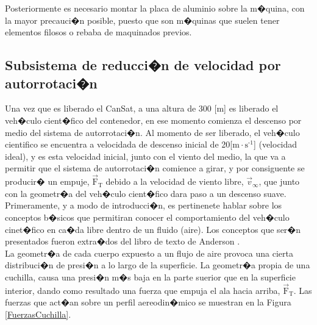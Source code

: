 \documentclass[10pt,a4paper]{book}
\begin{document}
Posteriormente es necesario montar la placa de aluminio sobre la m�quina, con la mayor precauci�n posible, puesto que son m�quinas que suelen tener elementos filosos o rebaba de maquinados previos.
\subsection{Subsistema de reducci�n de velocidad por autorrotaci�n}
Una vez que es liberado el CanSat, a una altura de 300 [m] es liberado el veh�culo cient�fico del contenedor, en ese momento comienza el descenso por medio del sistema de autorrotaci�n. Al momento de ser liberado, el veh�culo cientifico se encuentra a velocidada de descenso inicial de 20[$\text{m} \cdot \text{s}^{\text{-1}}$] (velocidad ideal), y es esta velocidad inicial, junto con el viento del medio, la que  va a permitir que el sistema de autorrotaci�n comience  a girar, y por consiguente se producir� un empuje, $\overrightarrow{\text{F}}_{\text{T}}$ debido a la velocidad de viento libre, $\overrightarrow{v}_{\infty}$, que junto con la geometr�a del veh�culo cient�fico dara paso a un descenso suave.\\

Primeramente, y a modo de introducci�n, es pertinenete hablar sobre los conceptos b�sicos que permitiran conocer el comportamiento del veh�culo cinet�fico en ca�da libre dentro de un fluido (aire). Los conceptos que ser�n presentados fueron extra�dos del libro de texto de Anderson \cite{Anderson}.\\
La geometr�a de cada cuerpo expuesto a un flujo de aire provoca una cierta distribuci�n de presi�n a lo largo de la superficie. La geometr�a propia de una cuchilla, causa una presi�n m�s baja en la parte suerior que en la superficie interior, dando como resultado una fuerza que empuja el ala hacia arriba, $\overrightarrow{\text{F}}_{\text{T}}$. Las fuerzas que act�an sobre un perfil aereodin�mico se muestran en la Figura \ref{FuerzasCuchilla}.
\end{document}
